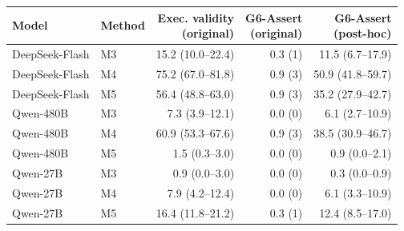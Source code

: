 \begin{tabular}{@{}llrrr@{}}
\toprule
Model & Method & \shortstack{Exec. validity\\(original)} & \shortstack{G6-Assert\\(original)} & \shortstack{G6-Assert\\(post-hoc)} \\
\midrule
DeepSeek-Flash & M3 & 15.2 (10.0--22.4) & 0.3 (1) & 11.5 (6.7--17.9) \\
DeepSeek-Flash & M4 & 75.2 (67.0--81.8) & 0.9 (3) & 50.9 (41.8--59.7) \\
DeepSeek-Flash & M5 & 56.4 (48.8--63.0) & 0.9 (3) & 35.2 (27.9--42.7) \\
Qwen-480B & M3 & 7.3 (3.9--12.1) & 0.0 (0) & 6.1 (2.7--10.9) \\
Qwen-480B & M4 & 60.9 (53.3--67.6) & 0.9 (3) & 38.5 (30.9--46.7) \\
Qwen-480B & M5 & 1.5 (0.3--3.0) & 0.0 (0) & 0.9 (0.0--2.1) \\
Qwen-27B & M3 & 0.9 (0.0--3.0) & 0.0 (0) & 0.3 (0.0--0.9) \\
Qwen-27B & M4 & 7.9 (4.2--12.4) & 0.0 (0) & 6.1 (3.3--10.9) \\
Qwen-27B & M5 & 16.4 (11.8--21.2) & 0.3 (1) & 12.4 (8.5--17.0) \\
\bottomrule
\end{tabular}
